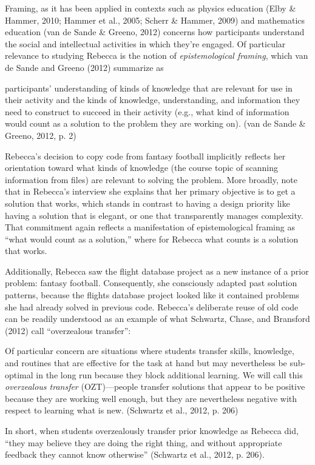 Framing, as it has been applied in contexts such as physics education
(Elby \& Hammer, 2010; Hammer et al., 2005; Scherr \& Hammer, 2009) and
mathematics education (van de Sande \& Greeno, 2012) concerns how
participants understand the social and intellectual activities in which
they're engaged. Of particular relevance to studying Rebecca is the
notion of \emph{epistemological framing}, which van de Sande and Greeno
(2012) summarize as

participants' understanding of kinds of knowledge that are relevant for
use in their activity and the kinds of knowledge, understanding, and
information they need to construct to succeed in their activity (e.g.,
what kind of information would count as a solution to the problem they
are working on). (van de Sande \& Greeno, 2012, p. 2)

Rebecca's decision to copy code from fantasy football implicitly
reflects her orientation toward what kinds of knowledge (the course
topic of scanning information from files) are relevant to solving the
problem. More broadly, note that in Rebecca's interview she explains
that her primary objective is to get a solution that works, which stands
in contrast to having a design priority like having a solution that is
elegant, or one that transparently manages complexity. That commitment
again reflects a manifestation of epistemological framing as ``what
would count as a solution,'' where for Rebecca what counts is a solution
that works.

Additionally, Rebecca saw the flight database project as a new instance
of a prior problem: fantasy football. Consequently, she consciously
adapted past solution patterns, because the flights database project
looked like it contained problems she had already solved in previous
code. Rebecca's deliberate reuse of old code can be readily understood
as an example of what Schwartz, Chase, and Bransford (2012) call
``overzealous transfer'':

Of particular concern are situations where students transfer skills,
knowledge, and routines that are effective for the task at hand but may
nevertheless be sub-optimal in the long run because they block
additional learning. We will call this \emph{overzealous transfer}
(OZT)---people transfer solutions that appear to be positive because
they are working well enough, but they are nevertheless negative with
respect to learning what is new. (Schwartz et al., 2012, p. 206)

In short, when students overzealously transfer prior knowledge as
Rebecca did, ``they may believe they are doing the right thing, and
without appropriate feedback they cannot know otherwise'' (Schwartz et
al., 2012, p. 206).

